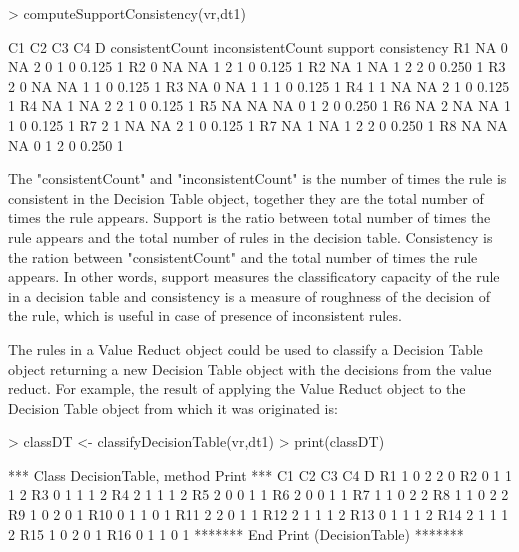 \documentclass[a4paper]{article}
\begin{document}
\begin{Schunk}
\begin{Sinput}
> computeSupportConsistency(vr,dt1)
\end{Sinput}
\begin{Soutput}
   C1 C2 C3 C4 D consistentCount inconsistentCount support consistency
R1 NA  0 NA  2 0               1                 0   0.125           1
R2  0 NA NA  1 2               1                 0   0.125           1
R2 NA  1 NA  1 2               2                 0   0.250           1
R3  2  0 NA NA 1               1                 0   0.125           1
R3 NA  0 NA  1 1               1                 0   0.125           1
R4  1  1 NA NA 2               1                 0   0.125           1
R4 NA  1 NA  2 2               1                 0   0.125           1
R5 NA NA NA  0 1               2                 0   0.250           1
R6 NA  2 NA NA 1               1                 0   0.125           1
R7  2  1 NA NA 2               1                 0   0.125           1
R7 NA  1 NA  1 2               2                 0   0.250           1
R8 NA NA NA  0 1               2                 0   0.250           1
\end{Soutput}
\end{Schunk}

The "consistentCount" and "inconsistentCount" is the number of times the rule is consistent in the Decision Table object, together they are the total number of times the rule appears. Support is the ratio between total number of times the rule appears and the total number of rules in the decision table. Consistency is the ration between "consistentCount" and the total number of times the rule appears. In other words, support measures the classificatory capacity of the rule in a decision table and consistency is a measure of roughness of the decision of the rule, which is useful in case of presence of  inconsistent rules.

The rules in a Value Reduct object could be used to classify a Decision Table object returning a new Decision Table object with the decisions from the value reduct. For example, the result of applying the Value Reduct object to the Decision Table object from which it was originated is:

\begin{Schunk}
\begin{Sinput}
> classDT <- classifyDecisionTable(vr,dt1)
> print(classDT)
\end{Sinput}
\begin{Soutput}
*** Class DecisionTable, method Print *** 
    C1 C2 C3 C4 D
R1  1  0  2  2  0
R2  0  1  1  1  2
R3  0  1  1  1  2
R4  2  1  1  1  2
R5  2  0  0  1  1
R6  2  0  0  1  1
R7  1  1  0  2  2
R8  1  1  0  2  2
R9  1  0  2  0  1
R10 0  1  1  0  1
R11 2  2  0  1  1
R12 2  1  1  1  2
R13 0  1  1  1  2
R14 2  1  1  1  2
R15 1  0  2  0  1
R16 0  1  1  0  1
******* End Print (DecisionTable) ******* 
\end{Soutput}
\end{Schunk}
\end{document}
